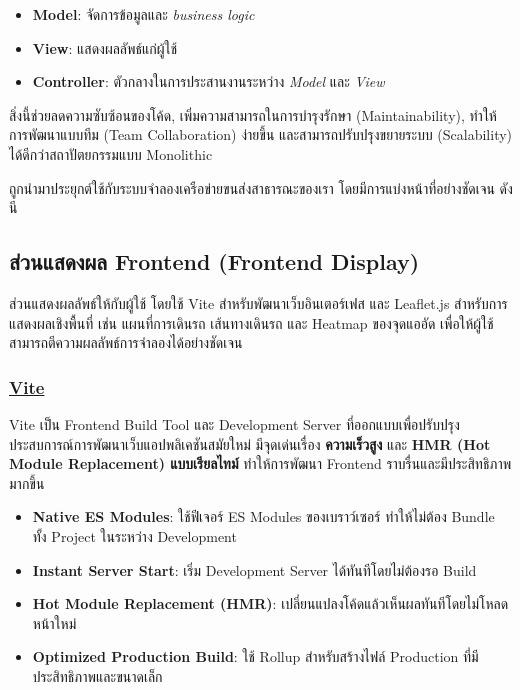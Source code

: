 \begin{itemize}
  \item \textbf{Model}: จัดการข้อมูลและ \textit{business logic}
  \item \textbf{View}: แสดงผลลัพธ์แก่ผู้ใช้
  \item \textbf{Controller}: ตัวกลางในการประสานงานระหว่าง \textit{Model} และ \textit{View}
\end{itemize}

สิ่งนี้ช่วยลดความซับซ้อนของโค้ด, เพิ่มความสามารถในการบำรุงรักษา (Maintainability), 
ทำให้การพัฒนาแบบทีม (Team Collaboration) ง่ายขึ้น และสามารถปรับปรุงขยายระบบ (Scalability) 
ได้ดีกว่าสถาปัตยกรรมแบบ Monolithic

\indent ถูกนำมาประยุกต์ใช้กับระบบจำลองเครือข่ายขนส่งสาธารณะของเรา โดยมีการแบ่งหน้าที่อย่างชัดเจน ดังนี

\subsection{ส่วนแสดงผล Frontend (Frontend Display)}
\begin{mypara}
    \indent ส่วนแสดงผลลัพธ์ให้กับผู้ใช้ โดยใช้ Vite
สำหรับพัฒนาเว็บอินเตอร์เฟส และ Leaflet.js สำหรับการแสดงผลเชิงพื้นที่ 
เช่น แผนที่การเดินรถ เส้นทางเดินรถ และ Heatmap ของจุดแออัด 
เพื่อให้ผู้ใช้สามารถตีความผลลัพธ์การจำลองได้อย่างชัดเจน
\end{mypara}

\subsubsection{\textbf{\underline{Vite}}}
    \begin{mypara}
        \indent Vite เป็น Frontend Build Tool และ Development Server ที่ออกแบบเพื่อปรับปรุงประสบการณ์การพัฒนาเว็บแอปพลิเคชันสมัยใหม่ มีจุดเด่นเรื่อง \textbf{ความเร็วสูง} และ \textbf{HMR (Hot Module Replacement) แบบเรียลไทม์} ทำให้การพัฒนา Frontend ราบรื่นและมีประสิทธิภาพมากขึ้น  
    \end{mypara}

\begin{itemize}
    \item \textbf{Native ES Modules}: ใช้ฟีเจอร์ ES Modules ของเบราว์เซอร์ ทำให้ไม่ต้อง Bundle ทั้ง Project ในระหว่าง Development
    \item \textbf{Instant Server Start}: เริ่ม Development Server ได้ทันทีโดยไม่ต้องรอ Build
    \item \textbf{Hot Module Replacement (HMR)}: เปลี่ยนแปลงโค้ดแล้วเห็นผลทันทีโดยไม่โหลดหน้าใหม่
    \item \textbf{Optimized Production Build}: ใช้ Rollup สำหรับสร้างไฟล์ Production ที่มีประสิทธิภาพและขนาดเล็ก
\end{itemize}

